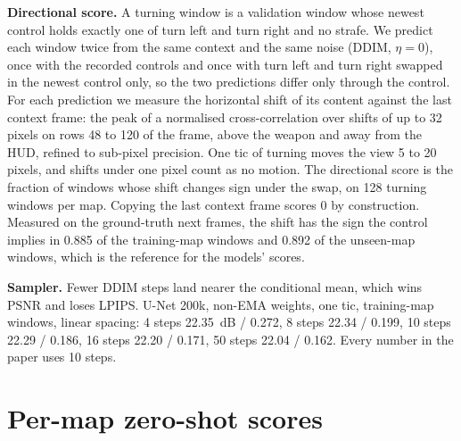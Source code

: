 \textbf{Directional score.} A turning window is a validation window whose newest control holds exactly one of turn left and turn right and no strafe. We predict each window twice from the same context and the same noise (DDIM, $\eta = 0$), once with the recorded controls and once with turn left and turn right swapped in the newest control only, so the two predictions differ only through the control. For each prediction we measure the horizontal shift of its content against the last context frame: the peak of a normalised cross-correlation over shifts of up to 32 pixels on rows 48 to 120 of the frame, above the weapon and away from the HUD, refined to sub-pixel precision. One tic of turning moves the view 5 to 20 pixels, and shifts under one pixel count as no motion. The directional score is the fraction of windows whose shift changes sign under the swap, on 128 turning windows per map. Copying the last context frame scores 0 by construction. Measured on the ground-truth next frames, the shift has the sign the control implies in 0.885 of the training-map windows and 0.892 of the unseen-map windows, which is the reference for the models' scores.

\textbf{Sampler.} Fewer DDIM steps land nearer the conditional mean, which wins PSNR and loses LPIPS. U-Net 200k, non-EMA weights, one tic, training-map windows, linear spacing: 4 steps 22.35~dB / 0.272, 8 steps 22.34 / 0.199, 10 steps 22.29 / 0.186, 16 steps 22.20 / 0.171, 50 steps 22.04 / 0.162. Every number in the paper uses 10 steps.

\section{Per-map zero-shot scores}
\label{app:perarena}

